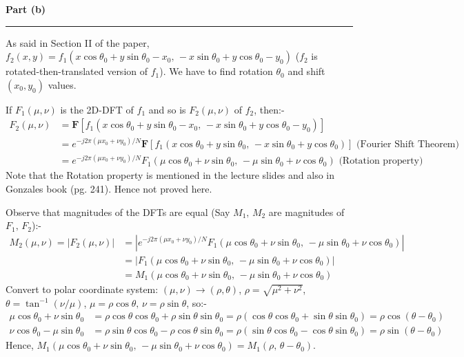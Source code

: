 \documentclass[a4paper,12pt]{article}
\newenvironment{solution}[2][]{%
\begin{mdframed}[linecolor=blue!70!black, linewidth=2pt, roundcorner=10pt, backgroundcolor=yellow!10!white, skipabove=12pt, skipbelow=12pt]%
	\textbf{\large #2}
	\par\noindent\rule{\textwidth}{0.4pt}
}{
\end{mdframed}
}
\begin{document}
\begin{solution}{Part (b)}
	As said in Section II of the paper, $f_2(x, y) = f_1(x \cos \theta_0 + y \sin \theta_0 - x_0, \, - x \sin \theta_0 + y \cos \theta_0 - y_0)$ ($f_2$ is rotated-then-translated version of $f_1$). We have to find rotation $\theta_0$ and shift $(x_0, y_0)$ values.
	
	If $F_1(\mu, \nu)$ is the 2D-DFT of $f_1$ and so is $F_2(\mu, \nu)$ of $f_2$, then:-
	\begin{align*}
		F_2(\mu, \nu) &= \mathbf{F} [f_1(x \cos \theta_0 + y \sin \theta_0 - x_0, \, - x \sin \theta_0 + y \cos \theta_0 - y_0)] \\
		&= e^{-j2\pi (\mu x_0 + \nu y_0)/N} \mathbf{F} [f_1(x \cos \theta_0 + y \sin \theta_0, \, - x \sin \theta_0 + y \cos \theta_0)] \text{ (Fourier Shift Theorem)}\\
		&= e^{-j2\pi (\mu x_0 + \nu y_0)/N} F_1(\mu \cos \theta_0 + \nu \sin \theta_0, \, - \mu \sin \theta_0 + \nu \cos \theta_0) \text{ (Rotation property)}
	\end{align*}
	Note that the Rotation property is mentioned in the lecture slides and also in Gonzales book (pg. 241). Hence not proved here.

	Observe that magnitudes of the DFTs are equal (Say $M_1, \, M_2$ are magnitudes of $F_1, \, F_2$):-
	\begin{align*}
		M_2(\mu, \nu) = |F_2(\mu, \nu)| &= |e^{-j2\pi (\mu x_0 + \nu y_0)/N} F_1(\mu \cos \theta_0 + \nu \sin \theta_0, \, - \mu \sin \theta_0 + \nu \cos \theta_0)| \\
		&= |F_1(\mu \cos \theta_0 + \nu \sin \theta_0, \, - \mu \sin \theta_0 + \nu \cos \theta_0)| \\
		&= M_1(\mu \cos \theta_0 + \nu \sin \theta_0, \, - \mu \sin \theta_0 + \nu \cos \theta_0)
	\end{align*}
	Convert to polar coordinate system: $(\mu, \nu) \rightarrow (\rho, \theta)$, $\rho = \sqrt{\mu^2 + \nu^2}$, $\theta = \tan^{-1}(\nu/\mu)$, $\mu = \rho \cos \theta, \, \nu = \rho \sin \theta$, so:-
	\begin{align*}
		\mu \cos \theta_0 + \nu \sin \theta_0 &= \rho \cos \theta \cos \theta_0 + \rho \sin \theta \sin \theta_0 = \rho (\cos \theta \cos \theta_0 + \sin \theta \sin \theta_0) = \rho \cos (\theta - \theta_0) \\
		\nu \cos \theta_0 - \mu \sin \theta_0 &= \rho \sin \theta \cos \theta_0 - \rho \cos \theta \sin \theta_0 = \rho (\sin \theta \cos \theta_0 - \cos \theta \sin \theta_0) = \rho \sin (\theta - \theta_0)
	\end{align*}
	Hence, $M_1(\mu \cos \theta_0 + \nu \sin \theta_0, \, - \mu \sin \theta_0 + \nu \cos \theta_0) = M_1(\rho, \, \theta - \theta_0)$.
	

\end{solution}
\end{document}
